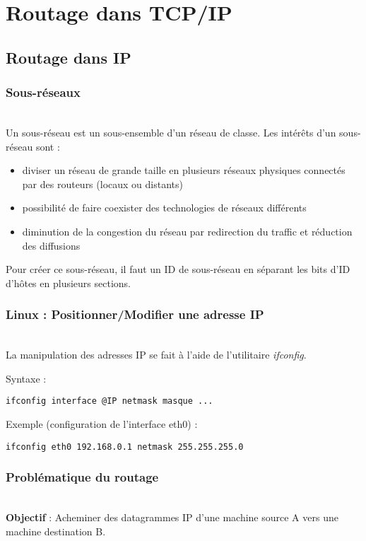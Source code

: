 \documentclass[journal, a4paper]{IEEEtran}
\begin{document}
	\newpage

\section{Routage dans TCP/IP}

\subsection{Routage dans IP}

\subsubsection{Sous-réseaux}
~\\
Un sous-réseau est un sous-ensemble d'un réseau de classe.
Les intérêts d'un sous-réseau sont :
\begin{itemize}
	\item diviser un réseau de grande taille en plusieurs réseaux physiques connectés par des routeurs (locaux ou distants)
	\item possibilité de faire coexister des technologies de réseaux différents
	\item diminution de la congestion du réseau par redirection du traffic et réduction des diffusions
\end{itemize}
Pour créer ce sous-réseau, il faut un ID de sous-réseau en séparant les bits d'ID d'hôtes en plusieurs sections.
~\\
\subsubsection{Linux : Positionner/Modifier une adresse IP}
~\\
La manipulation des adresses IP se fait à l'aide de l'utilitaire \textit{ifconfig}.

Syntaxe :
\lstset{language=sh}
\begin{lstlisting}
ifconfig interface @IP netmask masque ...
\end{lstlisting}

Exemple (configuration de l'interface eth0) :
\begin{lstlisting}
ifconfig eth0 192.168.0.1 netmask 255.255.255.0
\end{lstlisting}
\subsubsection{Problématique du routage}
~\\
\textbf{Objectif} : Acheminer des datagrammes IP d’une machine source A vers une machine destination B.
\end{document}
